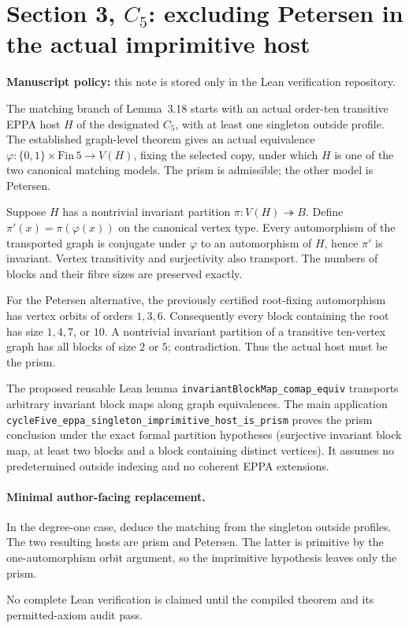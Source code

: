 \documentclass[11pt]{article}
\begin{document}
\section*{Section 3, \(C_5\): excluding Petersen in the actual imprimitive host}
\textbf{Manuscript policy:} this note is stored only in the
Lean verification repository.

The matching branch of Lemma~3.18 starts with an actual
order-ten transitive EPPA host \(H\) of the designated
\(C_5\), with at least one singleton outside profile.
The established graph-level theorem gives an actual
equivalence \(\varphi:\{0,1\}\times\mathrm{Fin}\,5
\longrightarrow V(H)\), fixing the selected copy, under
which \(H\) is one of the two canonical matching models.
The prism is admissible; the other model is Petersen.

Suppose \(H\) has a nontrivial invariant partition
\(\pi:V(H)\twoheadrightarrow B\). Define
\(\pi'(x)=\pi(\varphi(x))\) on the canonical vertex type.
Every automorphism of the transported graph is conjugate
under \(\varphi\) to an automorphism of \(H\), hence
\(\pi'\) is invariant. Vertex transitivity and surjectivity
also transport. The numbers of blocks and their fibre
sizes are preserved exactly.

For the Petersen alternative, the previously certified
root-fixing automorphism has vertex orbits of orders
\(1,3,6\). Consequently every block containing the root
has size \(1,4,7\), or \(10\). A nontrivial invariant
partition of a transitive ten-vertex graph has all
blocks of size \(2\) or \(5\); contradiction.
Thus the actual host must be the prism.

The proposed reusable Lean lemma
\texttt{invariantBlockMap\_comap\_equiv} transports
arbitrary invariant block maps along graph equivalences.
The main application
\texttt{cycleFive\_eppa\_singleton\_imprimitive\_host\_is\_prism}
proves the prism conclusion under the exact formal
partition hypotheses (surjective invariant block map,
at least two blocks and a block containing distinct
vertices). It assumes no predetermined outside indexing
and no coherent EPPA extensions.

\paragraph{Minimal author-facing replacement.}
In the degree-one case, deduce the matching from the
singleton outside profiles. The two resulting hosts
are prism and Petersen. The latter is primitive by the
one-automorphism orbit argument, so the imprimitive
hypothesis leaves only the prism.

No complete Lean verification is claimed until the
compiled theorem and its permitted-axiom audit pass.
\end{document}
